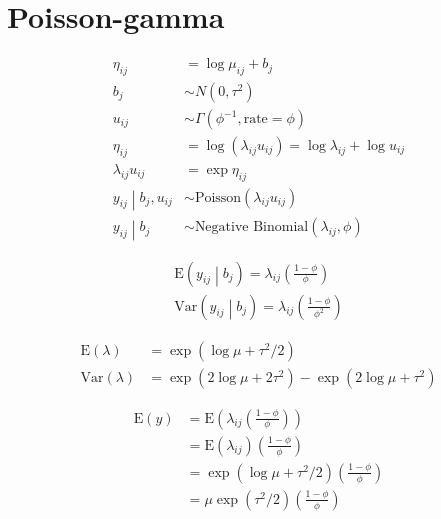 \documentclass{article}
\begin{document}

\section{Poisson-gamma}
\begin{align*}
\eta_{ij} & = \log{\mu_{ij}} + b_j \\
b_j & \sim N\left(0, \tau^2\right) \\
u_{ij} & \sim \Gamma\left(\phi^{-1}, \text{rate}=\phi\right) \\
\eta_{ij} & = \log{\left(\lambda_{ij} u_{ij} \right)} = \log{\lambda_{ij}} + \log{u_{ij}} \\
\lambda_{ij} u_{ij} & = \exp{\eta_{ij}} \\
\left.y_{ij} \middle| b_j, u_{ij}\right. & \sim \text{Poisson}\left(\lambda_{ij} u_{ij}\right) \\
\left.y_{ij} \middle| b_j \right. & \sim \text{Negative Binomial}\left(\lambda_{ij}, \phi\right)
\end{align*}

\begin{align*}
\text{E}\left(y_{ij} \middle| b_j\right) = \lambda_{ij} \left(\frac{1-\phi}{\phi}\right) \\
\text{Var}\left(y_{ij} \middle| b_j\right) = \lambda_{ij} \left(\frac{1-\phi}{\phi^2}\right)
\end{align*}




\begin{align*}
\text{E}\left(\lambda\right) & = \exp{\left(\log{\mu}+\tau^2 / 2\right)} \\
\text{Var}\left(\lambda\right) & = \exp{\left(2 \log{\mu} + 2\tau^2 \right)} - \exp{\left(2\log{\mu} + \tau^2 \right)}
\end{align*}


\begin{align*}
\text{E}\left(y\right) & = \text{E}\left(\lambda_{ij} \left(\frac{1-\phi}{\phi}\right)\right) \\
& = \text{E}\left(\lambda_{ij} \right) \left(\frac{1-\phi}{\phi}\right) \\
& = \exp{\left(\log{\mu}+\tau^2 / 2\right)} \left(\frac{1-\phi}{\phi}\right) \\
& = \mu \exp{\left(\tau^2 / 2\right)} \left(\frac{1-\phi}{\phi}\right)
\end{align*}
\end{document}
